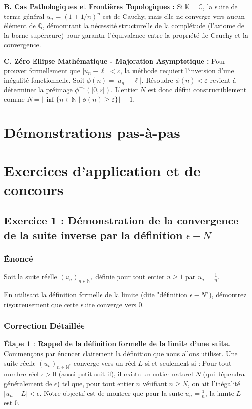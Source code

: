 \documentclass[a4paper,11pt]{report}
\begin{document}
\textbf{B. Cas Pathologiques et Frontières Topologiques :}
Si $\mathbb{K} = \mathbb{Q}$, la suite de terme général $u_n = (1 + 1/n)^n$ est de Cauchy, mais elle ne converge vers aucun élément de $\mathbb{Q}$, démontrant la nécessité structurelle de la complétude (l'axiome de la borne supérieure) pour garantir l'équivalence entre la propriété de Cauchy et la convergence.

\textbf{C. Zéro Ellipse Mathématique - Majoration Asymptotique :}
Pour prouver formellement que $|u_n - \ell| < \varepsilon$, la méthode requiert l'inversion d'une inégalité fonctionnelle. Soit $\phi(n) = |u_n - \ell|$. Résoudre $\phi(n) < \varepsilon$ revient à déterminer la préimage $\phi^{-1}([0, \varepsilon[)$. L'entier $N$ est donc défini constructiblement comme $N = \lfloor \inf \{ n \in \mathbb{N} \mid \phi(n) \ge \varepsilon \} \rfloor + 1$.


\chapter{Démonstrations pas-à-pas}

\chapter{Exercices d'application et de concours}

\section*{Exercice 1 : Démonstration de la convergence de la suite inverse par la définition $\epsilon-N$}
\subsection*{Énoncé}

Soit la suite réelle $(u_n)_{n \in \mathbb{N}^*}$ définie pour tout entier $n \ge 1$ par $u_n = \frac{1}{n}$.

En utilisant la définition formelle de la limite (dite "définition $\epsilon-N$"), démontrez rigoureusement que cette suite converge vers 0.

\subsection*{Correction Détaillée}

\textbf{Étape 1 : Rappel de la définition formelle de la limite d'une suite.}
Commençons par énoncer clairement la définition que nous allons utiliser.
Une suite réelle $(u_n)_{n \in \mathbb{N}^*}$ converge vers un réel $L$ si et seulement si :
Pour tout nombre réel $\epsilon > 0$ (aussi petit soit-il), il existe un entier naturel $N$ (qui dépendra généralement de $\epsilon$) tel que, pour tout entier $n$ vérifiant $n \ge N$, on ait l'inégalité $|u_n - L| < \epsilon$.
Notre objectif est de montrer que pour la suite $u_n = \frac{1}{n}$, la limite $L$ est 0.
\end{document}
